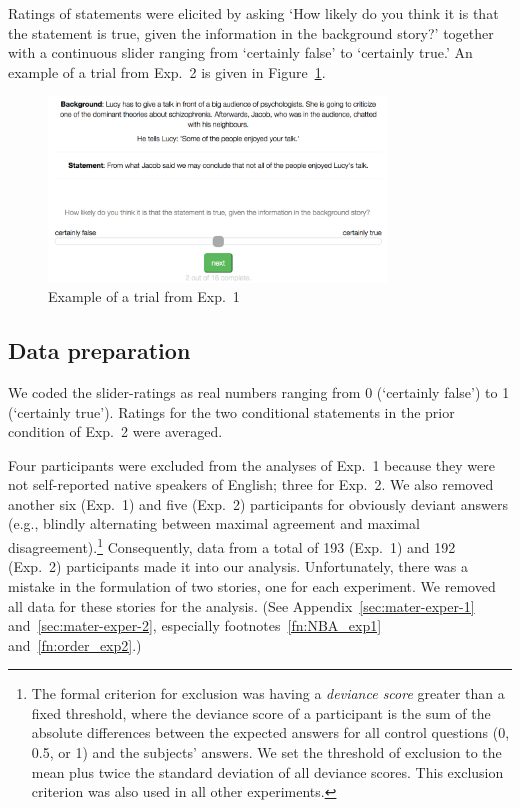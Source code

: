 \documentclass[12pt]{article}
\begin{document}
Ratings of statements were elicited by asking `How likely do you think it is that the
statement is true, given the information in the background story?' together with a continuous
slider ranging from `certainly false' to `certainly true.' An example of a trial from Exp.\ 2 is given
in Figure~\ref{fig:exampleShot}.

\begin{figure}
  \centering
  \includegraphics[width = 0.8\textwidth]{pics_02/expExampleShot_Lucy.png}
  \caption{Example of a trial from Exp.~1}
  \label{fig:exampleShot}
\end{figure}

\subsection*{Data preparation} 

We coded the slider-ratings as real numbers ranging from 0
(`certainly false') to 1 (`certainly true'). Ratings for the two conditional statements in the prior condition of Exp.\ 2 were averaged.

Four participants were excluded from the analyses of Exp.~1 because they were not self-reported
native speakers of English; three for Exp.~2. We also removed another six (Exp.~1) and five
(Exp.~2) participants for obviously deviant answers (e.g., blindly alternating between maximal
agreement and maximal disagreement).\footnote{The formal criterion for exclusion was having a
  \emph{deviance score} greater than a fixed threshold, where the deviance score of a
  participant is the sum of the absolute differences between the expected answers for all
  control questions (0, 0.5, or 1) and the subjects'
  answers. %
  We set the threshold of exclusion to the mean plus twice the standard deviation of all
  deviance scores. This exclusion criterion was also used in all other experiments.}
Consequently, data from a total of 193 (Exp.\ 1) and 192 (Exp.\ 2) participants made it into
our analysis. Unfortunately, there was a mistake in the formulation of two stories, one for
each experiment. We removed all data for these stories for the analysis. (See
Appendix~\ref{sec:mater-exper-1} and~\ref{sec:mater-exper-2}, especially
footnotes~\ref{fn:NBA_exp1} and~\ref{fn:order_exp2}.)
\end{document}
